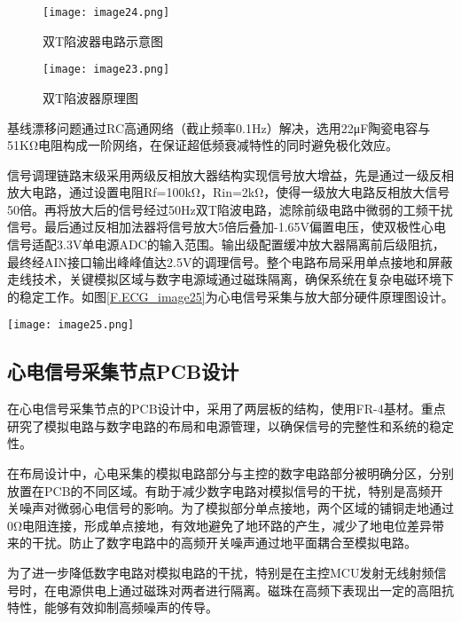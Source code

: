 \begin{figure}[hbt]
    \centering
    \texttt{[image: image24.png]}
    \caption{双T陷波器电路示意图\cite{新概念模拟电路3}}
    \label{F.ECG_image24}
\end{figure}

\begin{figure}[hbt]
    \centering
    \texttt{[image: image23.png]}
    \caption{双T陷波器原理图}
    \label{F.ECG_image23}
\end{figure}

基线漂移问题通过RC高通网络（截止频率0.1Hz）解决，选用22μF陶瓷电容与51KΩ电阻构成一阶网络，在保证超低频衰减特性的同时避免极化效应。

信号调理链路末级采用两级反相放大器结构实现信号放大增益，先是通过一级反相放大电路，通过设置电阻Rf=100kΩ，Rin=2kΩ，使得一级放大电路反相放大信号50倍。再将放大后的信号经过50Hz双T陷波电路，滤除前级电路中微弱的工频干扰信号。最后通过反相加法器将信号放大5倍后叠加-1.65V偏置电压，使双极性心电信号适配3.3V单电源ADC的输入范围。输出级配置缓冲放大器隔离前后级阻抗，最终经AIN接口输出峰峰值达2.5V的调理信号。整个电路布局采用单点接地和屏蔽走线技术，关键模拟区域与数字电源域通过磁珠隔离，确保系统在复杂电磁环境下的稳定工作。如图\ref{F.ECG_image25}为心电信号采集与放大部分硬件原理图设计。

\begin{sidewaysfigure}
    \centering
    \texttt{[image: image25.png]}
    \caption{心电信号采集与放大部分硬件原理图设计}
    \label{F.ECG_image25}
\end{sidewaysfigure}

\newpage

\subsection{心电信号采集节点PCB设计}

在心电信号采集节点的PCB设计中，采用了两层板的结构，使用FR-4基材。重点研究了模拟电路与数字电路的布局和电源管理，以确保信号的完整性和系统的稳定性。

在布局设计中，心电采集的模拟电路部分与主控的数字电路部分被明确分区，分别放置在PCB的不同区域。有助于减少数字电路对模拟信号的干扰，特别是高频开关噪声对微弱心电信号的影响。为了模拟部分单点接地，两个区域的铺铜走地通过0Ω电阻连接，形成单点接地，有效地避免了地环路的产生，减少了地电位差异带来的干扰。防止了数字电路中的高频开关噪声通过地平面耦合至模拟电路。

为了进一步降低数字电路对模拟电路的干扰，特别是在主控MCU发射无线射频信号时，在电源供电上通过磁珠对两者进行隔离。磁珠在高频下表现出一定的高阻抗特性，能够有效抑制高频噪声的传导。

